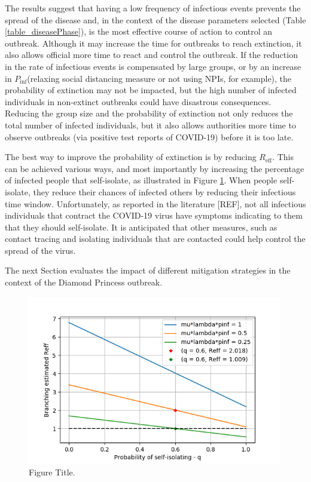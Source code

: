 \documentclass[sr]{drdc-report}
\def\Reff{\ensuremath{R_\mathrm{eff}}}
\def\Pinf{\ensuremath{P_\mathrm{inf}}}
\begin{document}
The results suggest that having a low frequency of infectious events prevents the spread of the disease and, in the context of the disease parameters selected (Table \ref{table_diseasePhase}), is the most effective course of action to control an outbreak. Although it may increase the time for outbreaks to reach extinction, it also allows official more time to react and control the outbreak. If the reduction in the rate of infectious events is compensated by large groups, or by an increase in \Pinf (relaxing social distancing measure or not using NPIs, for example), the probability of extinction may not be impacted, but the high number of infected individuals in non-extinct outbreaks could have disastrous consequences. Reducing the group size and the probability of extinction not only reduces the total number of infected individuals, but it also allows authorities more time to observe outbreaks (via positive test reports of COVID-19) before it is too late.  

The best way to improve the probability of extinction is by reducing \Reff. This can be achieved various ways, and most importantly by increasing the percentage of infected people that self-isolate, as illustrated in Figure \ref{fig_plt_brReffvsq}. When people self-isolate, they reduce their chances of infected others by reducing their infectious time window. Unfortunately, as reported in the literature [REF], not all infectious individuals that contract the COVID-19 virus have symptoms indicating to them that they should self-isolate. It is anticipated that other measures, such as contact tracing and isolating individuals that are contacted could help control the spread of the virus. 

The next Section evaluates the impact of different mitigation strategies in the context of the Diamond Princess outbreak. 

\begin{figure}
  \includegraphics[width=0.99\textwidth, keepaspectratio=true]{figures/plt_brReffvsq}
  \caption{Figure Title.}\label{fig_plt_brReffvsq}
\end{figure}
\end{document}
